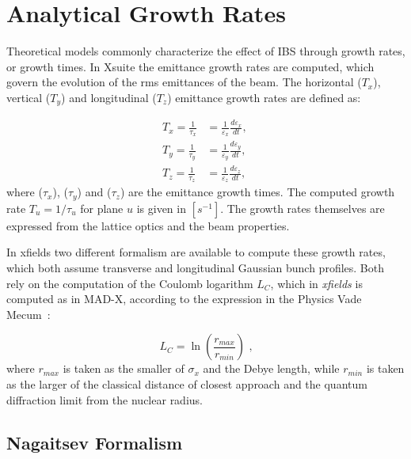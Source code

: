 \section{Analytical Growth Rates}
\label{subsection:ibs_growth_rates}

Theoretical models commonly characterize the effect of IBS through growth rates, or growth times.
In Xsuite the emittance growth rates are computed, which govern the evolution of the rms emittances of the beam.
The horizontal (\(T_x\)), vertical (\(T_y\)) and longitudinal (\(T_z\)) emittance growth rates are defined as:

\begin{equation}
    \begin{aligned}
        T_x = \frac{1}{\tau_x} &= \frac{1}{\varepsilon_x} \frac{d \varepsilon_x}{dt} \text{,  } \\
        T_y = \frac{1}{\tau_y} &= \frac{1}{\varepsilon_y} \frac{d \varepsilon_y}{dt} \text{,  } \\
        T_z = \frac{1}{\tau_z} &= \frac{1}{\varepsilon_z} \frac{d \varepsilon_z}{dt} \text{, }
    \end{aligned}
    \label{equation:ibs_rms_emittances_evolutions}
\end{equation}
where (\(\tau_x\)), (\(\tau_y\)) and (\(\tau_z\)) are the emittance growth times.
The computed growth rate \(T_u = 1 / \tau_u\) for plane \(u\) is given in \(\left[s^{-1}\right]\). 
The growth rates themselves are expressed from the lattice optics and the beam properties.

In xfields two different formalism are available to compute these growth rates, which both assume transverse and longitudinal Gaussian bunch profiles.
Both rely on the computation of the Coulomb logarithm \(L_C\), which in \textit{xfields} is computed as in MAD-X, according to the expression in the Physics Vade Mecum~\cite{AIP:Anderson:Physics_Vade_Mecum}:

\begin{equation}
    L_C = \ln \left( \frac{r_{max}}{r_{min}} \right) \text{ ,}
    \label{equation:coulomb_logarithm}
\end{equation}
where \(r_{max}\) is taken as the smaller of \(\sigma_x\) and the Debye length, while \(r_{min}\) is taken as the larger of the classical distance of closest approach and the quantum diffraction limit from the nuclear radius.

\subsection{Nagaitsev Formalism}  

